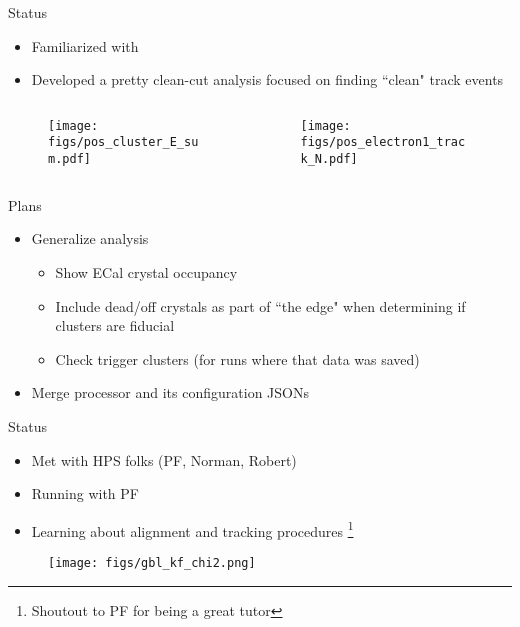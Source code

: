 \documentclass[aspectratio=169]{beamer}
\begin{document}
\begin{frame}{Status}
  \begin{itemize}
    \item Familiarized with  \checkmark
    \item Developed a pretty clean-cut analysis focused on finding ``clean" track events
  \end{itemize}
  \begin{columns}
    \begin{column}{0.5\textwidth}
      \begin{figure}
        \centering
        \texttt{[image: figs/pos\_cluster\_E\_sum.pdf]}
      \end{figure}
    \end{column}
    \begin{column}{0.5\textwidth}
      \begin{figure}
        \centering
        \texttt{[image: figs/pos\_electron1\_track\_N.pdf]}
      \end{figure}
    \end{column}
  \end{columns}
\end{frame}

\begin{frame}{Plans}
  \begin{itemize}
    \item Generalize analysis
      \begin{itemize}
        \item Show ECal crystal occupancy
        \item Include dead/off crystals as part of ``the edge" when determining if clusters are fiducial
        \item Check trigger clusters (for runs where that data was saved)
      \end{itemize}
    \item Merge processor and its configuration JSONs
  \end{itemize}
\end{frame}


\begin{frame}{Status}
  \begin{itemize}
    \item Met with HPS folks (PF, Norman, Robert) \checkmark
    \item Running  with PF \checkmark
    \item Learning about alignment and tracking procedures
      \footnote{Shoutout to PF for being a great tutor}
  \end{itemize}
  \begin{figure}
    \centering
    \texttt{[image: figs/gbl\_kf\_chi2.png]}
  \end{figure}
\end{frame}
\end{document}
